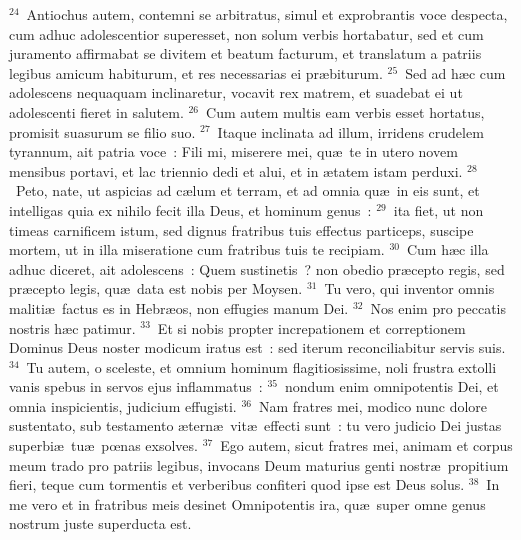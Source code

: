 ${}^{24}$~Antiochus autem, contemni se arbitratus, simul et exprobrantis voce despecta, cum adhuc adolescentior superesset, non solum verbis hortabatur, sed et cum juramento affirmabat se divitem et beatum facturum, et translatum a patriis legibus amicum habiturum, et res necessarias ei pr\ae biturum.
${}^{25}$~Sed ad h\ae c cum adolescens nequaquam inclinaretur, vocavit rex matrem, et suadebat ei ut adolescenti fieret in salutem.
${}^{26}$~Cum autem multis eam verbis esset hortatus, promisit suasurum se filio suo.
${}^{27}$~Itaque inclinata ad illum, irridens crudelem tyrannum, ait patria voce~: Fili mi, miserere mei, qu\ae\ te in utero novem mensibus portavi, et lac triennio dedi et alui, et in \ae tatem istam perduxi.
${}^{28}$~Peto, nate, ut aspicias ad c\ae lum et terram, et ad omnia qu\ae\ in eis sunt, et intelligas quia ex nihilo fecit illa Deus, et hominum genus~:
${}^{29}$~ita fiet, ut non timeas carnificem istum, sed dignus fratribus tuis effectus particeps, suscipe mortem, ut in illa miseratione cum fratribus tuis te recipiam.
${}^{30}$~Cum h\ae c illa adhuc diceret, ait adolescens~: Quem sustinetis~? non obedio pr\ae cepto regis, sed pr\ae cepto legis, qu\ae\ data est nobis per Moysen.
${}^{31}$~Tu vero, qui inventor omnis maliti\ae\ factus es in Hebr\ae os, non effugies manum Dei.
${}^{32}$~Nos enim pro peccatis nostris h\ae c patimur.
${}^{33}$~Et si nobis propter increpationem et correptionem Dominus Deus noster modicum iratus est~: sed iterum reconciliabitur servis suis.
${}^{34}$~Tu autem, o sceleste, et omnium hominum flagitiosissime, noli frustra extolli vanis spebus in servos ejus inflammatus~:
${}^{35}$~nondum enim omnipotentis Dei, et omnia inspicientis, judicium effugisti.
${}^{36}$~Nam fratres mei, modico nunc dolore sustentato, sub testamento \ae tern\ae\ vit\ae\ effecti sunt~: tu vero judicio Dei justas superbi\ae\ tu\ae\ pœnas exsolves.
${}^{37}$~Ego autem, sicut fratres mei, animam et corpus meum trado pro patriis legibus, invocans Deum maturius genti nostr\ae\ propitium fieri, teque cum tormentis et verberibus confiteri quod ipse est Deus solus.
${}^{38}$~In me vero et in fratribus meis desinet Omnipotentis ira, qu\ae\ super omne genus nostrum juste superducta est.



